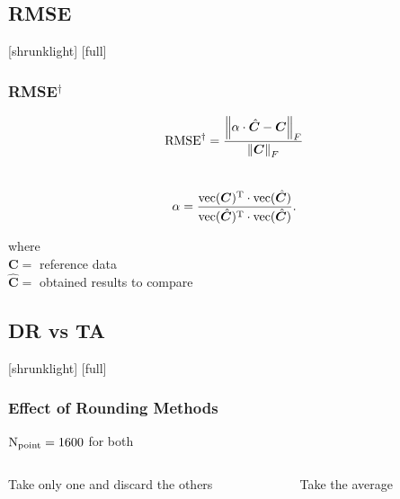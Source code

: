 \documentclass[12pt,compress,aspectratio=169]{beamer} %
\begin{document}
\subsection{RMSE}
[shrunklight]
[full]
\begin{frame}[t]
	\frametitle{RMSE$^{\dagger}$}
	\begin{equation*} 
		\operatorname{RMSE}^{\dagger} = \frac{\left \| \alpha \cdot \hat{\bm{C}} - \bm{C} \right 		\|_{F}}{\left \| \bm{C} \right \|_{F}}
	\end{equation*}\\
	
	\begin{equation*} 
		\alpha = \frac{ \operatorname{vec}(\bm{C})^{\operatorname{T}} \cdot \operatorname{vec}(\hat{\bm{C}}) }{ \operatorname{vec}(\hat{\bm{C}})^{\operatorname{T}} \cdot \operatorname{vec}(\hat{\bm{C}})} .
	\end{equation*}
	
	\centering
	where \\
	$\bm{C} =$ reference data\\ 
	$\hat{\bm{C}} =$ obtained results to compare
\end{frame}


\subsection{DR vs TA}
[shrunklight]
[full] 
\begin{frame}[t]
	\frametitle{Effect of Rounding Methods}
	$\operatorname{N}_{\operatorname{point}} = 1600$ for both
	\begin{columns}
	\begin{column}{0.5\textwidth}
	\centering
	\hspace*{-0.4cm}
	Take only one and discard the others\\
	\end{column}
	
	\begin{column}{0.5\textwidth}
	\centering
	Take the average\\
	\end{column}	
	\end{columns}
\end{frame}
\end{document}

